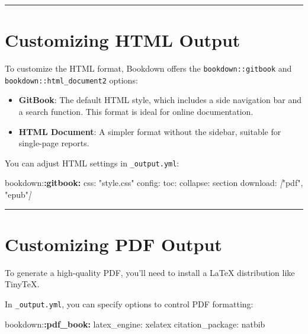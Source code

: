 \documentclass[
]{book}
\newenvironment{Shaded}{\begin{snugshade}}{\end{snugshade}}
\newcommand{\CommentTok}[1]{\textcolor[rgb]{0.56,0.35,0.01}{\textit{#1}}}
\newcommand{\NormalTok}[1]{#1}
\newcommand{\OtherTok}[1]{\textcolor[rgb]{0.56,0.35,0.01}{#1}}
\newcommand{\SpecialCharTok}[1]{\textcolor[rgb]{0.81,0.36,0.00}{\textbf{#1}}}
\providecommand{\tightlist}{%
  \setlength{\itemsep}{0pt}\setlength{\parskip}{0pt}}
\theoremstyle{definition}
\theoremstyle{definition}
\theoremstyle{definition}
\theoremstyle{definition}
\theoremstyle{remark}
\begin{document}
\begin{center}\rule{0.5\linewidth}{0.5pt}\end{center}

\section{Customizing HTML Output}\label{customizing-html-output}

To customize the HTML format, Bookdown offers the \texttt{bookdown::gitbook} and \texttt{bookdown::html\_document2} options:

\begin{itemize}
\tightlist
\item
  \textbf{GitBook}: The default HTML style, which includes a side navigation bar and a search function. This format is ideal for online documentation.
\item
  \textbf{HTML Document}: A simpler format without the sidebar, suitable for single-page reports.
\end{itemize}

You can adjust HTML settings in \texttt{\_output.yml}:

\begin{Shaded}
\begin{Highlighting}[]
\NormalTok{bookdown:}\SpecialCharTok{:gitbook:}
\NormalTok{  css: "style.css"}
\NormalTok{  config:}
\NormalTok{    toc:}
\NormalTok{      collapse: section}
\NormalTok{    download: }\CommentTok{[}\OtherTok{"pdf", "epub"}\CommentTok{]}
\end{Highlighting}
\end{Shaded}

\begin{center}\rule{0.5\linewidth}{0.5pt}\end{center}

\section{Customizing PDF Output}\label{customizing-pdf-output}

To generate a high-quality PDF, you'll need to install a LaTeX distribution like TinyTeX.

In \texttt{\_output.yml}, you can specify options to control PDF formatting:

\begin{Shaded}
\begin{Highlighting}[]
\NormalTok{bookdown:}\SpecialCharTok{:pdf\_book:}
\NormalTok{  latex\_engine: xelatex}
\NormalTok{  citation\_package: natbib}
\end{Highlighting}
\end{Shaded}
\end{document}
